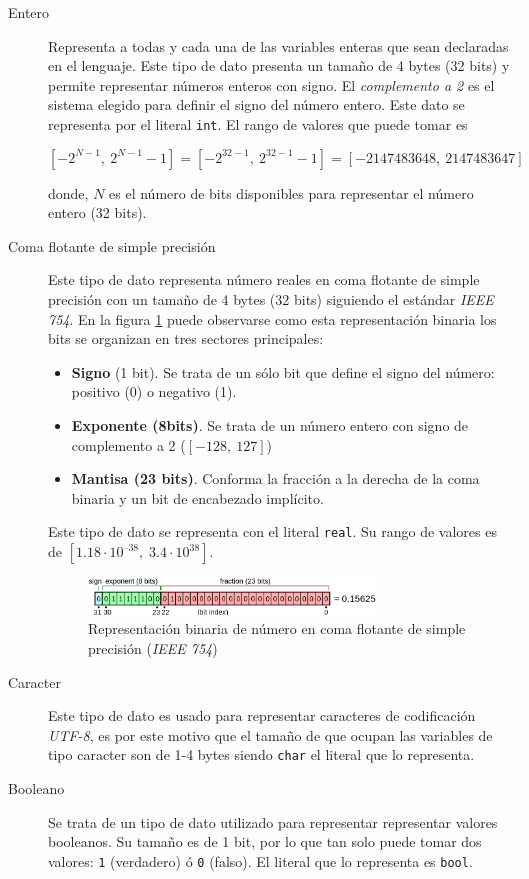 \documentclass[11pt, english]{article}
\begin{document}
\begin{description}
	\item[Entero] Representa a todas y cada una de las variables enteras que sean declaradas en el lenguaje. Este tipo de dato presenta un tamaño de 4 bytes (32 bits) y permite representar números enteros con signo. El \emph{complemento a 2} es el sistema elegido para definir el signo del número entero. Este dato se representa por el literal \texttt{int}. El rango de valores que puede tomar es

	\begin{equation}\label{eq:equation1}
		\left [-2^{N-1},\: 2^{N-1}-1 \right ] = \left [-2^{32-1},\: 2^{32-1}-1 \right] = \left [-2147483648,\: 2147483647 \right]
	\end{equation}

	donde, $N$ es el número de bits disponibles para representar el número entero (32 bits).
	\item[Coma flotante de simple precisión] Este tipo de dato representa número reales en coma flotante de simple precisión con un tamaño de 4 bytes (32 bits) siguiendo el estándar \emph{IEEE 754}. En la figura \ref{fig:figure1} puede observarse como esta representación binaria los bits se organizan en tres sectores principales:
	\begin{itemize}
		\item \textbf{Signo} (1 bit). Se trata de un sólo bit que define el signo del número: positivo (0) o negativo (1).
		\item  \textbf{Exponente (8bits)}. Se trata de un número entero con signo de complemento a 2 ($\left [ -128,\: 127\right ]$)
		\item \textbf{Mantisa (23 bits)}. Conforma la fracción a la derecha de la coma binaria y un bit de encabezado implícito.
	\end{itemize}
	Este tipo de dato se representa con el literal \texttt{real}. Su rango de valores es de $\left [ 1.18 \cdot 10^{–38},\; 3.4 \cdot 10^{38} \right ]$.
	\begin{figure}[H]\label{fig:figure1}
		\centering
		\includegraphics[width=0.75\textwidth]{../res/pics/data-types/float_diag.png}
		\caption{Representación binaria de número en coma flotante de simple precisión (\emph{IEEE 754})}
	\end{figure}

	\item[Caracter] Este tipo de dato es usado para representar caracteres de codificación \emph{UTF-8}, es por este motivo que el tamaño de que ocupan las variables de tipo caracter son de 1-4 bytes siendo \texttt{char} el literal que lo representa.
	\item[Booleano] Se trata de un tipo de dato utilizado para representar representar valores booleanos. Su tamaño es de 1 bit, por lo que tan solo puede tomar dos valores: \texttt{1} (verdadero) ó \texttt{0} (falso). El literal que lo representa es \texttt{bool}.
\end{description}
\end{document}
